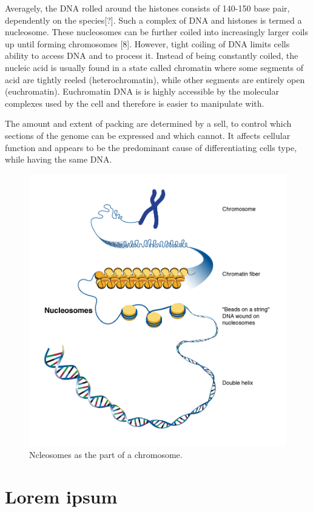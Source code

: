 Averagely, the DNA rolled around the histones consists of 140-150 base pair, dependently on the species[?]. Such a complex of DNA and histones is termed a nucleosome. These nucleosomes can be further coiled into increasingly larger coils up until forming chromosomes [8]. However, tight coiling of DNA limits cells ability to access DNA and to process it. Instead of being constantly coiled, the nucleic acid is usually found in a state called chromatin where some segments of acid are tightly reeled (heterochromatin), while other segments are entirely open (euchromatin). Euchromatin DNA is is highly accessible by the molecular complexes used by the cell and therefore is easier to manipulate with. 

The amount and extent of packing are determined by a sell, to control which sections of the genome can be expressed and which cannot. It affects cellular function and appears to be the predominant cause of differentiating cells type, while having the same DNA.

\begin{figure}[!ht]
	\centering
	\includegraphics[width=.9\textwidth]{figures/nucleosome1}
	\caption{Ncleosomes as the part of a chromosome.\label{o:latex_friendly_zone}}
\end{figure}
\section{Lorem ipsum}
\blindtext

